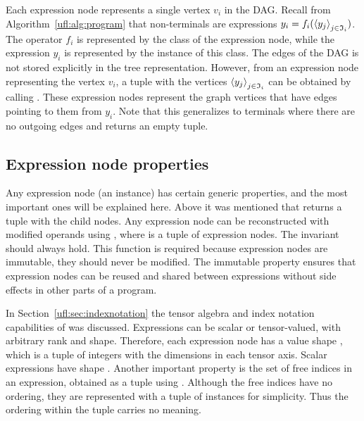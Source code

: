 Each expression node represents a single vertex $v_i$ in the DAG.
Recall from Algorithm~\ref{ufl:alg:program} that non-terminals are
expressions $y_i = f_i(\left<y_j\right>_{j\in\mathfrak{I}_i})$.  The operator
$f_i$ is represented by the class of the expression node, while the
expression $y_i$ is represented by the instance of this class.  The
edges of the DAG is not stored explicitly in the tree
representation. However, from an expression node representing the
vertex $v_i$, a tuple with the vertices $\left<y_j\right>_{j\in\mathfrak{I}_i}$
can be obtained by calling .  These expression
nodes represent the graph vertices that have edges pointing to them
from $y_i$.  Note that this generalizes to terminals where there are
no outgoing edges and  returns an empty tuple.

\subsection{Expression node properties}

Any expression node  (an  instance) has certain
generic properties, and the most important ones will be explained
here.  Above it was mentioned that  returns a
tuple with the child nodes. Any expression node can be reconstructed
with modified operands using , where
 is a tuple of expression nodes.  The invariant
 should always hold.  This
function is required because expression nodes are immutable, they
should never be modified. The immutable property ensures that
expression nodes can be reused and shared between expressions without
side effects in other parts of a program.


In Section~\ref{ufl:sec:indexnotation} the tensor algebra and index
notation capabilities of \ufl{} was discussed.  Expressions can be
scalar or tensor-valued, with arbitrary rank and shape. Therefore,
each expression node has a value shape , which is a
tuple of integers with the dimensions in each tensor axis. Scalar
expressions have shape \icode{()}. Another important property is the
set of free indices in an expression, obtained as a tuple using
.  Although the free indices have no
ordering, they are represented with a tuple of  instances
for simplicity. Thus the ordering within the tuple carries no meaning.

